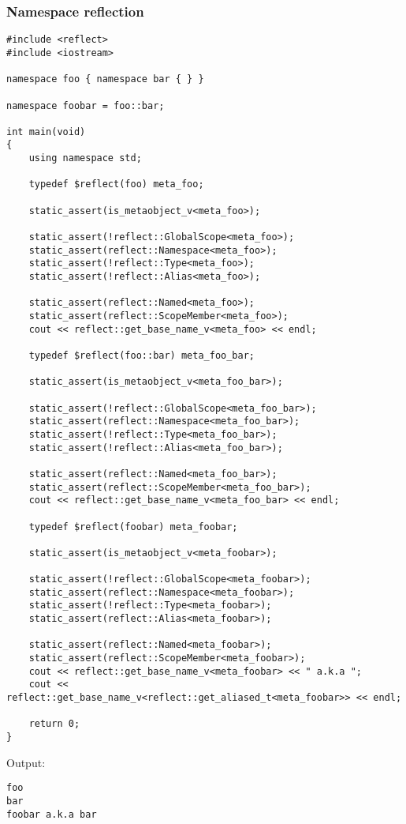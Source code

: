 \subsubsection{Namespace reflection}

\begin{verbatim}
#include <reflect>
#include <iostream>

namespace foo { namespace bar { } }

namespace foobar = foo::bar;

int main(void)
{
	using namespace std;

	typedef $reflect(foo) meta_foo;

	static_assert(is_metaobject_v<meta_foo>);

	static_assert(!reflect::GlobalScope<meta_foo>);
	static_assert(reflect::Namespace<meta_foo>);
	static_assert(!reflect::Type<meta_foo>);
	static_assert(!reflect::Alias<meta_foo>);

	static_assert(reflect::Named<meta_foo>);
	static_assert(reflect::ScopeMember<meta_foo>);
	cout << reflect::get_base_name_v<meta_foo> << endl;

	typedef $reflect(foo::bar) meta_foo_bar;

	static_assert(is_metaobject_v<meta_foo_bar>);

	static_assert(!reflect::GlobalScope<meta_foo_bar>);
	static_assert(reflect::Namespace<meta_foo_bar>);
	static_assert(!reflect::Type<meta_foo_bar>);
	static_assert(!reflect::Alias<meta_foo_bar>);

	static_assert(reflect::Named<meta_foo_bar>);
	static_assert(reflect::ScopeMember<meta_foo_bar>);
	cout << reflect::get_base_name_v<meta_foo_bar> << endl;

	typedef $reflect(foobar) meta_foobar;

	static_assert(is_metaobject_v<meta_foobar>);

	static_assert(!reflect::GlobalScope<meta_foobar>);
	static_assert(reflect::Namespace<meta_foobar>);
	static_assert(!reflect::Type<meta_foobar>);
	static_assert(reflect::Alias<meta_foobar>);

	static_assert(reflect::Named<meta_foobar>);
	static_assert(reflect::ScopeMember<meta_foobar>);
	cout << reflect::get_base_name_v<meta_foobar> << " a.k.a ";
	cout << reflect::get_base_name_v<reflect::get_aliased_t<meta_foobar>> << endl;

	return 0;
}
\end{verbatim}

Output:

\begin{verbatim}
foo
bar
foobar a.k.a bar
\end{verbatim}

